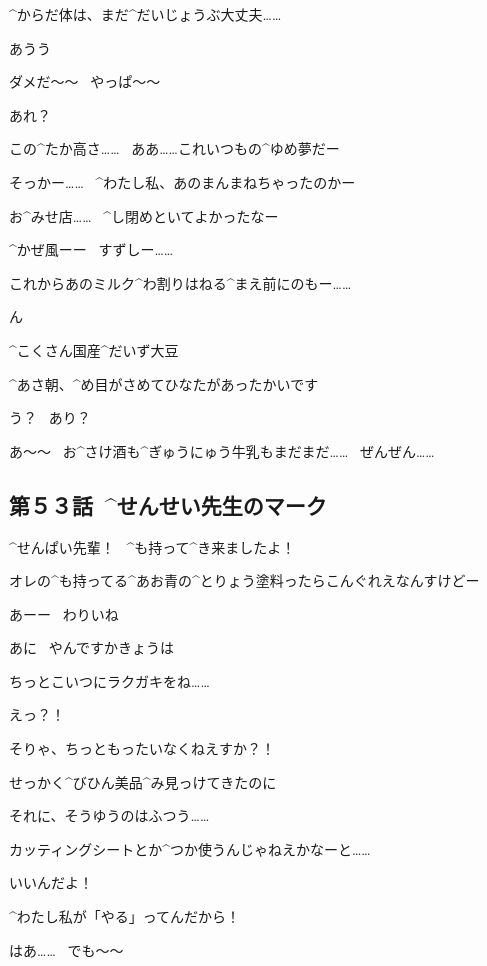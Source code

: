 \page[132]
\Alpha ^{からだ}{体}は、まだ^{だいじょうぶ}{大丈夫}……

\page[133]
\Alpha あうう

\Alpha ダメだ〜〜
\ やっぱ〜〜

\page[134]
\Alpha あれ？

\page[135]
\Alpha この^{たか}{高}さ……
\ ああ……これいつもの^{ゆめ}{夢}だー

\Alpha そっかー……
\ ^{わたし}{私}、あのまんまねちゃったのかー

\Alpha お^{みせ}{店}……
\ ^{し}{閉}めといてよかったなー

\Alpha ^{かぜ}{風}ーー
\ すずしー……

\Alpha これからあのミルク^{わ}{割}りはねる^{まえ}{前}にのもー……

\page[136]
\Alpha ん

\Sign ^{こくさん}{国産}^{だいず}{大豆}

\Alpha ^{あさ}{朝}、^{め}{目}がさめてひなたがあったかいです

\Alpha う？
\ あり？

\Alpha あ〜〜
\ お^{さけ}{酒}も^{ぎゅうにゅう}{牛乳}もまだまだ……
\ ぜんぜん……


\subsection{第５３話\ ^{せんせい}{先生}のマーク}

\page[140]
\Ojisan ^{せんぱい}{先輩}！
\ ^{も}{持}って^{き}{来}ましたよ！

\Ojisan オレの^{も}{持}ってる^{あお}{青}の^{とりょう}{塗料}ったらこんぐれえなんすけどー

\page[141]
\Sensei あーー
\ わりいね

\Ojisan あに
\ やんですかきょうは

\Sensei ちっとこいつにラクガキをね……

\Ojisan えっ？！

\Ojisan そりゃ、ちっともったいなくねえすか？！

\Ojisan せっかく^{びひん}{美品}^{み}{見}っけてきたのに

\page[142]
\Ojisan それに、そうゆうのはふつう……

\Ojisan カッティングシートとか^{つか}{使}うんじゃねえかなーと……

\Sensei いいんだよ！

\Sensei ^{わたし}{私}が「やる」ってんだから！

\Ojisan はあ……
\ でも〜〜

